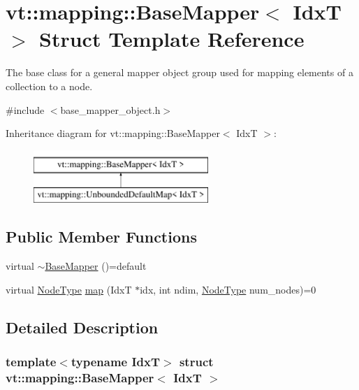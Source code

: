\hypertarget{structvt_1_1mapping_1_1_base_mapper}{}\section{vt\+:\+:mapping\+:\+:Base\+Mapper$<$ IdxT $>$ Struct Template Reference}
\label{structvt_1_1mapping_1_1_base_mapper}


The base class for a general mapper object group used for mapping elements of a collection to a node.  




{\ttfamily \#include $<$base\+\_\+mapper\+\_\+object.\+h$>$}

Inheritance diagram for vt\+:\+:mapping\+:\+:Base\+Mapper$<$ IdxT $>$\+:\begin{figure}[H]
\begin{center}
\leavevmode
\includegraphics[height=2.000000cm]{structvt_1_1mapping_1_1_base_mapper}
\end{center}
\end{figure}
\subsection*{Public Member Functions}
\begin{DoxyCompactItemize}
\item 
virtual \hyperlink{structvt_1_1mapping_1_1_base_mapper_acafa2909b2b0fd8e3a907562c099f722}{$\sim$\+Base\+Mapper} ()=default
\item 
virtual \hyperlink{namespacevt_a866da9d0efc19c0a1ce79e9e492f47e2}{Node\+Type} \hyperlink{structvt_1_1mapping_1_1_base_mapper_a940a3ea301c0f60b2b88218afbce5a4f}{map} (IdxT $\ast$idx, int ndim, \hyperlink{namespacevt_a866da9d0efc19c0a1ce79e9e492f47e2}{Node\+Type} num\+\_\+nodes)=0
\end{DoxyCompactItemize}


\subsection{Detailed Description}
\subsubsection*{template$<$typename IdxT$>$\newline
struct vt\+::mapping\+::\+Base\+Mapper$<$ Idx\+T $>$}


